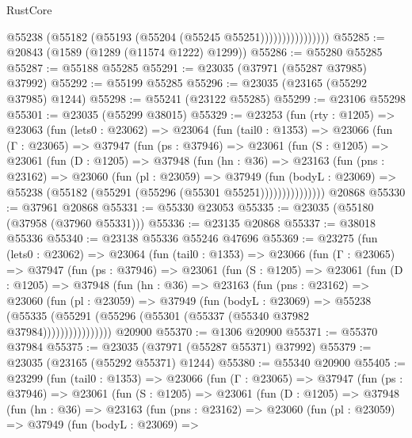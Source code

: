 \begin{lexlean}{RustCore}
\begin{coremodule}
                          @55238 (@55182 (@55193 (@55204 (@55245 @55251))))))))))))))))
@55285 := @20843 (@1589 (@1289 (@11574 @1222) @1299))
@55286 := @55280 @55285
@55287 := @55188 @55285
@55291 := @23035 (@37971 (@55287 @37985) @37992)
@55292 := @55199 @55285
@55296 := @23035 (@23165 (@55292 @37985) @1244)
@55298 := @55241 (@23122 @55285)
@55299 := @23106 @55298
@55301 := @23035 (@55299 @38015)
@55329 := @23253
    (fun (rty : @1205) =>
    @23063
      (fun (lets0 : @23062) =>
      @23064
        (fun (tail0 : @1353) =>
        @23066
          (fun (Γ : @23065) =>
          @37947
            (fun (ps : @37946) =>
            @23061
              (fun (S : @1205) =>
              @23061
                (fun (D : @1205) =>
                @37948
                  (fun (hn : @36) =>
                  @23163
                    (fun (pns : @23162) =>
                    @23060
                      (fun (pl : @23059) =>
                      @37949
                        (fun (bodyL : @23069) =>
                        @55238 (@55182 (@55291 (@55296 (@55301 @55251)))))))))))))))
    @20868
@55330 := @37961 @20868
@55331 := @55330 @23053
@55335 := @23035 (@55180 (@37958 (@37960 @55331)))
@55336 := @23135 @20868
@55337 := @38018 @55336
@55340 := @23138 @55336 @55246 @47696
@55369 := @23275
    (fun (lets0 : @23062) =>
    @23064
      (fun (tail0 : @1353) =>
      @23066
        (fun (Γ : @23065) =>
        @37947
          (fun (ps : @37946) =>
          @23061
            (fun (S : @1205) =>
            @23061
              (fun (D : @1205) =>
              @37948
                (fun (hn : @36) =>
                @23163
                  (fun (pns : @23162) =>
                  @23060
                    (fun (pl : @23059) =>
                    @37949
                      (fun (bodyL : @23069) =>
                      @55238
                        (@55335
                          (@55291 (@55296 (@55301 (@55337 (@55340 @37982 @37984))))))))))))))))
    @20900
@55370 := @1306 @20900
@55371 := @55370 @37984
@55375 := @23035 (@37971 (@55287 @55371) @37992)
@55379 := @23035 (@23165 (@55292 @55371) @1244)
@55380 := @55340 @20900
@55405 := @23299
    (fun (tail0 : @1353) =>
    @23066
      (fun (Γ : @23065) =>
      @37947
        (fun (ps : @37946) =>
        @23061
          (fun (S : @1205) =>
          @23061
            (fun (D : @1205) =>
            @37948
              (fun (hn : @36) =>
              @23163
                (fun (pns : @23162) =>
                @23060
                  (fun (pl : @23059) =>
                  @37949
                    (fun (bodyL : @23069) =>

\end{coremodule}
\end{lexlean}
